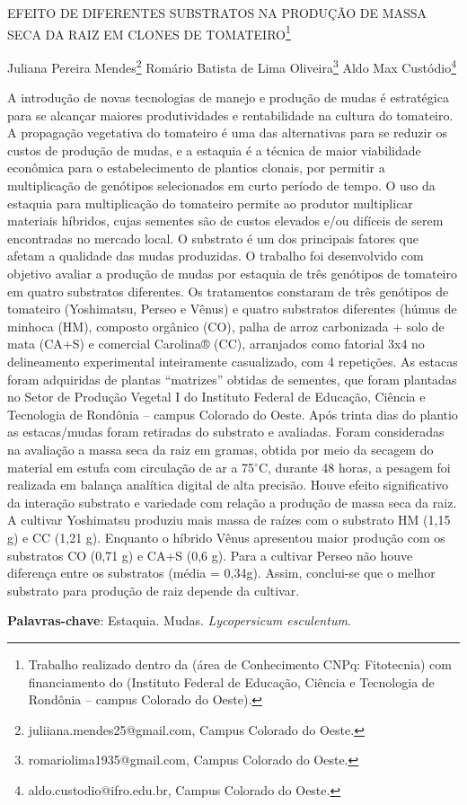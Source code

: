 \documentclass[article,12pt,onesidea,4paper,english,brazil]{abntex2}
\begin{document}
	
	
	\frenchspacing 
	
	\begin{center}
		\LARGE EFEITO DE DIFERENTES SUBSTRATOS NA PRODUÇÃO DE MASSA SECA DA RAIZ EM CLONES DE TOMATEIRO\footnote{Trabalho realizado dentro da (área de Conhecimento CNPq: Fitotecnia) com financiamento do (Instituto Federal de Educação, Ciência e Tecnologia de Rondônia – campus Colorado do Oeste).}
		
		\normalsize
		Juliana Pereira Mendes\footnote{juliiana.mendes25@gmail.com, Campus Colorado do Oeste.} 
	Romário Batista de Lima Oliveira\footnote{romariolima1935@gmail.com, Campus Colorado do Oeste.} 
		Aldo Max Custódio\footnote{aldo.custodio@ifro.edu.br, Campus Colorado do Oeste.} 

	\end{center}
	
	\noindent A introdução de novas tecnologias de manejo e produção de mudas é estratégica para se alcançar maiores produtividades e rentabilidade na cultura do tomateiro. A propagação vegetativa do tomateiro é uma das alternativas para se reduzir os custos de produção de mudas, e a estaquia é a técnica de maior viabilidade econômica para o estabelecimento de plantios clonais, por permitir a multiplicação de genótipos selecionados em curto período de tempo. O uso da estaquia para multiplicação do tomateiro permite ao produtor multiplicar materiais híbridos, cujas sementes são de custos elevados e/ou difíceis de serem encontradas no mercado local. O substrato é um dos principais fatores que afetam a qualidade das mudas produzidas. O trabalho foi desenvolvido com objetivo avaliar a produção de mudas por estaquia de três genótipos de tomateiro em quatro substratos diferentes. Os tratamentos constaram de três genótipos de tomateiro (Yoshimatsu, Perseo e Vênus) e quatro substratos diferentes (húmus de minhoca (HM), composto orgânico (CO), palha de arroz carbonizada + solo de mata (CA+S) e comercial Carolina® (CC), arranjados como fatorial 3x4 no delineamento experimental inteiramente casualizado, com 4 repetições. As estacas foram adquiridas de plantas “matrizes” obtidas de sementes, que foram plantadas no Setor de Produção Vegetal I do Instituto Federal de Educação, Ciência e Tecnologia de Rondônia – campus Colorado do Oeste. Após trinta dias do plantio as estacas/mudas foram retiradas do substrato e avaliadas. Foram consideradas na avaliação a massa seca da raiz em gramas, obtida por meio da secagem do material em estufa com circulação de ar a 75$^\circ$C, durante 48 horas, a pesagem foi realizada em balança analítica digital de alta precisão. Houve efeito significativo da interação substrato e variedade com relação a produção de massa seca da raiz. A cultivar Yoshimatsu produziu mais massa de raízes com o substrato HM (1,15 g) e CC (1,21 g). Enquanto o híbrido Vênus apresentou maior produção com os substratos CO (0,71 g) e CA+S (0,6 g). Para a cultivar Perseo não houve diferença entre os substratos (média = 0,34g). Assim, conclui-se que o melhor substrato para produção de raiz depende da cultivar.
	
	\vspace{\onelineskip}
	
	\noindent
	\textbf{Palavras-chave}: Estaquia. Mudas. \textit{Lycopersicum esculentum}.
	
\end{document}
